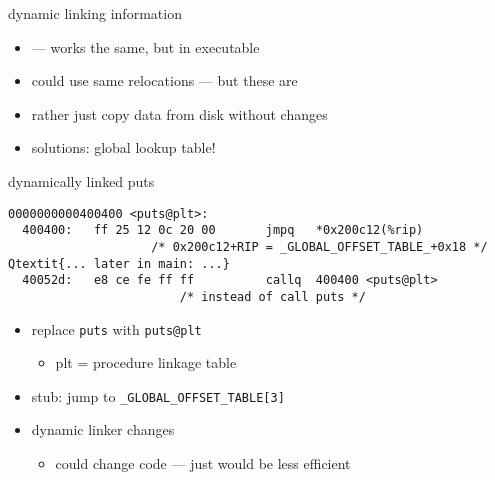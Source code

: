 \begin{frame}{dynamic linking information}
\begin{itemize}
\item {} --- works the same, but in executable
\item could use same relocations --- but these are 
\item rather just copy data from disk without changes
\item solutions: global lookup table!
\end{itemize}
\end{frame}

\begin{frame}[fragile,label=dynamicPuts]{dynamically linked puts}
\begin{Verbatim}[commandchars=Q\{\},fontsize=\fontsize{8}{9}\selectfont]
0000000000400400 <puts@plt>:
  400400:	ff 25 12 0c 20 00    	jmpq   *0x200c12(%rip) 
                    /* 0x200c12+RIP = _GLOBAL_OFFSET_TABLE_+0x18 */
Qtextit{... later in main: ...}
  40052d:	e8 ce fe ff ff       	callq  400400 <puts@plt>
                        /* instead of call puts */
\end{Verbatim}
\begin{itemize}
    \item replace {\tt puts} with  {\tt puts@plt} 
        \begin{itemize}
        \item plt = procedure linkage table
        \end{itemize}
    \item stub: jump to {\tt *\_GLOBAL\_OFFSET\_TABLE[3]}
    \item dynamic linker changes 
        \begin{itemize}
        \item could change code --- just would be less efficient
        \end{itemize}
\end{itemize}
\end{frame}


